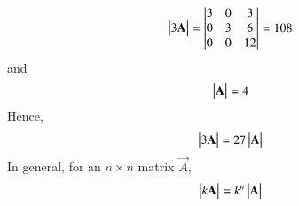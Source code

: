 \begin{align}
\begin{vmatrix}3\mathbf{A}\end{vmatrix} = \begin{vmatrix} 
3 & 0 & 3 
\\
0 & 3 & 6
\\
0 & 0 & 12
\end{vmatrix}
= 108
\end{align}
and 
\begin{align}
\begin{vmatrix}\mathbf{A}\end{vmatrix} = 4
\end{align}
Hence, 
\begin{align}
\begin{vmatrix}3\mathbf{A}\end{vmatrix} = 27\begin{vmatrix}\mathbf{A}\end{vmatrix}
\end{align}
In general, for an $n\times n$ matrix $\vec{A}$, 
\begin{align}
\begin{vmatrix}k\mathbf{A}\end{vmatrix} = k^n\begin{vmatrix}\mathbf{A}\end{vmatrix}
\end{align}
